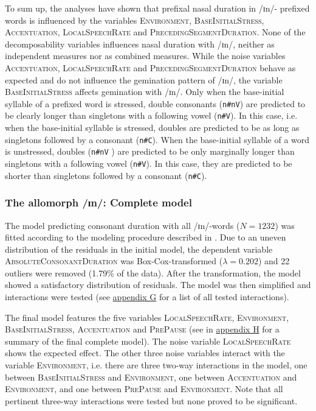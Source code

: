 To sum up, the analyses have shown that prefixal nasal duration in /ɪn/- prefixed words is influenced by the variables \textsc{Environment}, \textsc{BaseInitialStress}, \textsc{Accentuation}, \textsc{LocalSpeechRate} and \textsc{PrecedingSegmentDuration}. None of the decomposability variables influences nasal duration with /ɪn/, neither as independent measures nor as combined measures. 
While the noise variables \textsc{Accentuation}, \textsc{LocalSpeechRate} and \textsc{PrecedingSegmentDuration} behave as expected and do not influence the gemination pattern of /ɪn/, the variable \textsc{BaseInitialStress} affects gemination with /ɪn/. 
Only when the base-initial syllable of a prefixed word is stressed, double consonants (\texttt{n\#nV}) are predicted to be clearly longer than singletons with a following vowel (\texttt{n\#V}). In this case, i.e. when the base-initial syllable is stressed, doubles are predicted to be as long as singletons followed by a consonant (\texttt{n\#C}). When the base-initial syllable of a word is unstressed, doubles (\texttt{n\#nV} ) are predicted to be only marginally longer than singletons with a following vowel (\texttt{n\#V}). In this case, they are predicted to be shorter than singletons followed by a consonant (\texttt{n\#C}).

\subsubsection{The allomorph /ɪn/: Complete model}


The model predicting consonant duration with all /ɪn/-words ($N=1232$) was fitted according to the modeling procedure described in . Due to an uneven distribution of the residuals in the initial model, the dependent variable \textsc{AbsoluteConsonantDuration} was Box-Cox-transformed ($\lambda = 0.202$) and 22 outliers were removed (1.79\% of the data). 
After the transformation, the model showed a satisfactory distribution of residuals. The model was then simplified and interactions were tested (see \hyperref[Appendix G Summaries of tested interactions in experimental study]{appendix G} for a list of all tested interactions).




The final model features the five variables \textsc{LocalSpeechRate}, \textsc{Environment}, \textsc{BaseInitialStress}, \textsc{Accentuation} and \textsc{PrePause} (see  in \hyperref[Appendix H: Model Summaries Experiment]{appendix H} for a summary of the final complete model). 
The noise variable \textsc{LocalSpeechRate} shows the expected effect. The other three noise variables interact with the variable \textsc{Environment}, i.e. there are three two-way interactions in the model, one between \textsc{BaseInitialStress} and \textsc{Environment}, one between \textsc{Accentuation} and \textsc{Environment}, and one between \textsc{PrePause} and \textsc{Environment}.  Note that all pertinent three-way interactions were tested but none proved to be significant.


